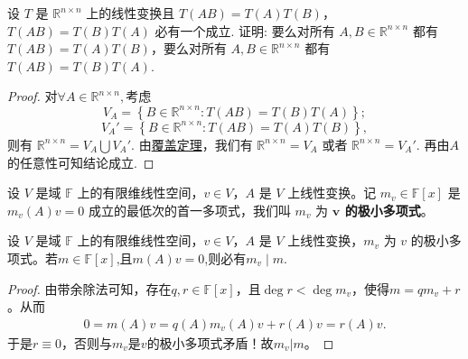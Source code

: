 \documentclass[../../main.tex]{subfiles}%
\begin{document}
\begin{example}
设 \( T \) 是 \( \mathbb{R}^{n \times n} \) 上的线性变换且 \( T(AB) = T(A)T(B) \)，\( T(AB) = T(B)T(A) \) 必有一个成立. 证明: 要么对所有 \( A, B \in \mathbb{R}^{n \times n} \) 都有 \( T(AB) = T(A)T(B) \)，要么对所有 \( A, B \in \mathbb{R}^{n \times n} \) 都有 \( T(AB) = T(B)T(A) \).  
\end{example}
\begin{proof}
对$\forall A\in \mathbb{R}^{n\times n},$考虑  
\[
V_A = \left\{ B \in \mathbb{R}^{n \times n} : T(AB) = T(B)T(A) \right\};
\]  
\[
V_A' = \left\{ B \in \mathbb{R}^{n \times n} : T(AB) = T(A)T(B) \right\},
\]  
则有 \( \mathbb{R}^{n \times n} = V_A \bigcup V_A' \). 由\hyperref[theorem:覆盖定理]{覆盖定理}，我们有 \( \mathbb{R}^{n \times n} = V_A \) 或者 \( \mathbb{R}^{n \times n} = V_A' \).  
再由$A$的任意性可知结论成立.
\end{proof}

\begin{definition}
设 \( V \) 是域 \( \mathbb{F} \) 上的有限维线性空间，\( v \in V \)，\( A \) 是 \( V \) 上线性变换。记 \( m_v \in \mathbb{F}[x] \) 是 \( m_v(A)v = 0 \) 成立的最低次的首一多项式，我们叫 \( m_v \) 为\textbf{ \( \boldsymbol{v} \) 的极小多项式}。
\end{definition}

\begin{proposition}\label{proposition:向量的极小多项式的整性}
设 \( V \) 是域 \( \mathbb{F} \) 上的有限维线性空间，\( v \in V \)，\( A \) 是 \( V \) 上线性变换，\( m_v \) 为 \( v \) 的极小多项式。若$m\in \mathbb{F}[x]$,且$m(A)v=0$,则必有$m_v\mid m.$
\end{proposition}
\begin{proof}
由带余除法可知，存在\( q,r\in \mathbb{F}[x] \)，且\( \deg r<\deg m_v \)，使得\( m=qm_v+r \)。从而
\begin{align*}
0=m(A)v=q(A)m_v(A)v+r(A)v=r(A)v.
\end{align*}
于是\( r\equiv 0 \)，否则与\( m_v \)是\( v \)的极小多项式矛盾！故\( m_v|m \)。
\end{proof}
\end{document}
